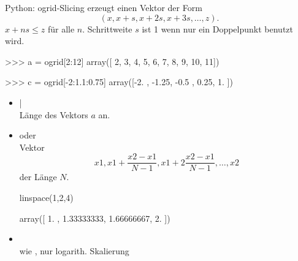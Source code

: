 \documentclass[hyperref={xetex}]{beamer}
\begin{document}
\begin{frame}[fragile]{Python: ogrid-Slicing}
 erzeugt einen Vektor der Form 
\[ (x,x+s,x+2s,x+3s, \ldots , z). \]
$x + ns \le z$ für alle $n$.
Schrittweite $s$ ist 1 wenn nur ein Doppelpunkt benutzt wird.
\begin{pyin}
>>> a = ogrid[2:12]
array([ 2,  3,  4,  5,  6,  7,  8,  9, 10, 11])

>>> c = ogrid[-2:1.1:0.75]
array([-2.  , -1.25, -0.5 ,  0.25,  1.  ])

\end{pyin}
\end{frame} 

%
%
\begin{frame}[fragile]{}
\begin{itemize}
\item {} |  \\ Länge des Vektors $a$ an.
\item {} oder \\ Vektor
\[ x1, x1+\frac{x2-x1}{N-1}, x1+2 \frac{x2-x1}{N-1}, \dots ,x2  \]
der Länge $N$.
\begin{pyin}
linspace(1,2,4)
\end{pyin}
\begin{pyout}
array([ 1.  ,  1.33333333,  1.66666667,  2. ])
\end{pyout}

\item {}\\ wie , nur logarith. Skalierung
\end{itemize}
\end{frame}
\end{document}
